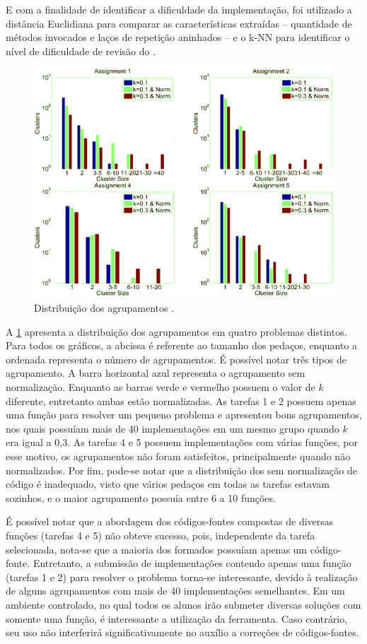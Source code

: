 		E com a finalidade de identificar a dificuldade da implementação, foi utilizado
		a distância Euclidiana para comparar as características extraídas -- quantidade
		de métodos invocados e laços de repetição aninhados -- e o \ac{k-NN} para identificar
		o nível de dificuldade de revisão do .
		
		\begin{figure}
			\centering
			\includegraphics[width=0.7\linewidth]{imagem/clusteringPerformance}
			\caption[Distribuição dos agrupamentos]{Distribuição dos agrupamentos \cite{Wei2015}.}
			\label{fig:clusteringPerformance}
		\end{figure}
		
		A \cref{fig:clusteringPerformance} apresenta a distribuição dos
		agrupamentos em quatro problemas distintos. Para todos os gráficos, a
		abcissa é referente ao tamanho dos pedaços, enquanto a ordenada representa
		o número de agrupamentos. É possível notar três tipos de agrupamento. A barra
		horizontal azul representa o agrupamento sem normalização. Enquanto as barras
		verde e vermelho possuem o valor de $k$ diferente, entretanto ambas estão
		normalizadas. As tarefas 1 e 2 possuem apenas uma função para resolver um
		pequeno problema e apresentou bons agrupamentos, nos quais possuíam mais
		de 40 implementações em um mesmo grupo quando $k$ era igual a 0,3. As
		tarefas 4 e 5 possuem implementações com várias funções, por esse motivo,
		os agrupamentos não foram satisfeitos, principalmente quando não normalizados.
		Por fim, pode-se notar que a distribuição dos  sem normalização
		de código é inadequado, visto que vários pedaços em todas as tarefas estavam
		sozinhos, e o maior agrupamento possuía entre 6 a 10 funções.
		
		É possível notar que a abordagem dos códigos-fontes compostas de diversas
		funções (tarefas 4 e 5) não obteve sucesso, pois, independente da tarefa
		selecionada, nota-se que a maioria dos  formados possuíam
		apenas um código-fonte. Entretanto, a submissão de implementações contendo
		apenas uma função (tarefas 1 e 2) para resolver o problema torna-se interessante,
		devido à realização de alguns agrupamentos com mais de 40 implementações
		semelhantes. Em um ambiente controlado, no qual todos os alunos irão submeter
		diversas soluções com somente uma função, é interessante a utilização da
		ferramenta. Caso contrário, seu uso não interferirá significativamente no
		auxílio a correções de códigos-fontes. 
		
